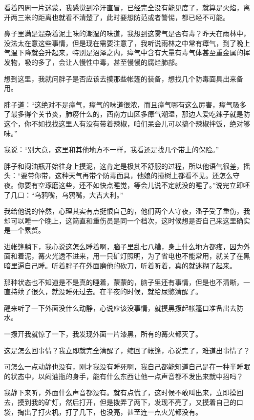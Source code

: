 看着四周一片迷蒙，我感觉到冷汗直冒，已经完全没有能见度了，就算是火焰，离开两三米的距离也就看不清楚了，此时要想防范或者警惕，都已经不可能。

鼻子里满是混杂着泥土味的潮湿的味道，我想到这雾气是否有毒？昨天在雨林中，没法太在意这些事情，但是现在需要注意了，我听说雨林之中常有瘴气，到了晚上气温下降就会升起来，特别是沼泽之内，瘴气中含有大量有毒气体甚至重金属的挥发物，吸的多了，会让人慢性中毒，甚至慢慢的腐烂肺部。

想到这里，我就问胖子是否应该去摸那些帐篷的装备，想找几个防毒面具出来备用。

胖子道：“这绝对不是瘴气，瘴气的味道很浓，而且瘴气哪有这么厉害，瘴气吸多了最多得个关节炎，肺痨什么的，西南方山区多瘴气潮湿，那边人爱吃辣子就是防这个，你不如找找这里人有没有带着辣椒，咱们呆会儿可以搞个辣椒拌饭，绝对够味。”

我说：“别大意，这里和其他地方不一样，我看还是找几个带上的保险。”

胖子和闷油瓶开始往身上摸泥，这肯定是极其不舒服的过程，所以他语气很差，摇头：“要带你带，这种天气再带个防毒面具，他娘的撞树上都看不见。还怎么守夜。你要有空琢磨这些，还不如快点睡觉，等会儿说不定就没的睡了。”说完立即呸了几口：“乌鸦嘴，乌鸦嘴，大吉大利。”

我给他说的悻然，心理其实有点挺恨自己的，他们两个人守夜，潘子受了重伤，我却可以睡一个晚上，这简直和重伤员是同一个档次，这时候想是否自己来这里确实是一个累赘。

进帐篷躺下，我心说这怎么睡着啊，脑子里乱七八糟，身上什么地方都疼，因为外面和着泥，篝火光透不进来，用一只矿灯照明，为了省电也不能常用，就关了在黑暗里逼自己睡。听着胖子在外面磨他的砍刀，听着听着，真的就迷糊了起来。

那种状态也不知道是不是真的睡着，蒙蒙的，脑子里还有事情，但是也不清晰，一直持续了很久，就没睡死过去。在半夜的时候，就给尿憋清醒了。

醒来听了一下外面没什么动静，心说应该没事情，就摸黑撩起帐篷口准备出去防水。

一撩开我就惊了一下，我发现外面一片漆黑，所有的篝火都灭了。

这是怎么回事情？我立即就完全清醒了，缩回了帐篷，心说完了，难道出事情了？

可怎么一点动静也没有，刚才我没有睡死啊，我自己都能知道自己是在一种半睡眠的状态中，以闷油瓶的身手，能有什么东西让他一点声音都不发出来就中招吗？

我静下来听，外面什么声音都没有。就有点慌了，这时候不敢叫出来，立即摸回去，摸到我的矿灯，然后打开，但是拨弄了两下，发现不亮了，又摸着自己的口袋，掏出了打火机，打了几下，也没亮，甚至连一点火光都没有。

